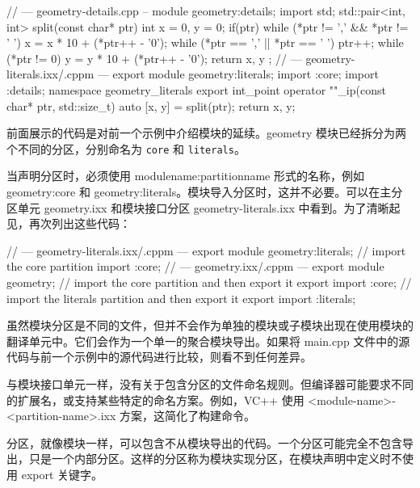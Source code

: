 \begin{itemize}
\begin{cpp}
// --- geometry-details.cpp --
module geometry:details;
import std;
std::pair<int, int> split(const char* ptr)
{
    int x = 0, y = 0;
    if(ptr)
    {
        while (*ptr != ',' && *ptr != ' ')
            x = x * 10 + (*ptr++ - '0');
        while (*ptr == ',' || *ptr == ' ') ptr++;
        while (*ptr != 0)
            y = y * 10 + (*ptr++ - '0');
    }
    return { x, y };
}
// --- geometry-literals.ixx/.cppm ---
export module geometry:literals;
import :core;
import :details;
namespace geometry_literals
{
    export int_point operator ""_ip(const char* ptr, std::size_t)
    {
        auto [x, y] = split(ptr);
        return {x, y};
    }
}
\end{cpp}
\end{itemize}


前面展示的代码是对前一个示例中介绍模块的延续。geometry 模块已经拆分为两个不同的分区，分别命名为 \verb|core| 和 \verb|literals|。

当声明分区时，必须使用 modulename:partitionname 形式的名称，例如 geometry:core 和 geometry:literals。模块导入分区时，这并不必要。可以在主分区单元 geometry.ixx 和模块接口分区 geometry-literals.ixx 中看到。为了清晰起见，再次列出这些代码：

\begin{cpp}
// --- geometry-literals.ixx/.cppm ---
export module geometry:literals;
// import the core partition
import :core;
// --- geometry.ixx/.cppm ---
export module geometry;
// import the core partition and then export it
export import :core;
// import the literals partition and then export it
export import :literals;
\end{cpp}

虽然模块分区是不同的文件，但并不会作为单独的模块或子模块出现在使用模块的翻译单元中。它们会作为一个单一的聚合模块导出。如果将 main.cpp 文件中的源代码与前一个示例中的源代码进行比较，则看不到任何差异。

\begin{myNotic}
与模块接口单元一样，没有关于包含分区的文件命名规则。但编译器可能要求不同的扩展名，或支持某些特定的命名方案。例如，VC++ 使用 <module-name>-<partition-name>.ixx 方案，这简化了构建命令。
\end{myNotic}

分区，就像模块一样，可以包含不从模块导出的代码。一个分区可能完全不包含导出，只是一个内部分区。这样的分区称为模块实现分区，在模块声明中定义时不使用 export 关键字。

